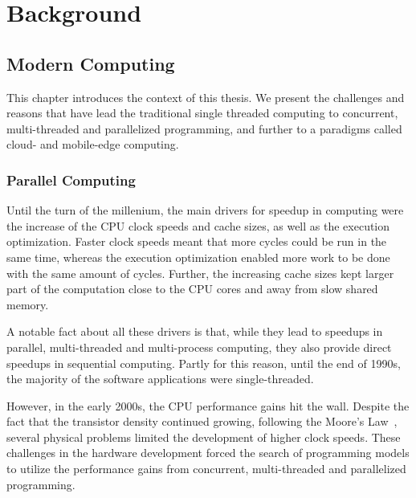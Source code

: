 \chapter{Background}
\label{chapter:background}


\section{Modern Computing}
This chapter introduces the context of this thesis. We present the challenges and reasons that have lead the traditional single threaded computing to concurrent, multi-threaded and parallelized programming, and further to a paradigms called cloud- and mobile-edge computing.

\subsection{Parallel Computing}
\label{section:parallel-computing}
Until the turn of the millenium, the main drivers for speedup in computing were the increase of the CPU clock speeds and cache sizes, as well as the execution optimization. Faster clock speeds meant that more cycles could be run in the same time, whereas the execution optimization enabled more work to be done with the same amount of cycles. Further, the increasing cache sizes kept larger part of the computation close to the CPU cores and away from slow shared memory.~\cite{Sutter:2005:FLiO}

A notable fact about all these drivers is that, while they lead to speedups in parallel, multi-threaded and multi-process computing, they also provide direct speedups in sequential computing. Partly for this reason, until the end of 1990s, the majority of the software applications were single-threaded.~\cite{Sutter:2005:FLiO}

However, in the early 2000s, the CPU performance gains hit the wall. Despite the fact that the transistor density continued growing, following the Moore's Law~\cite{Moore:1998:MooresLaw}, several physical problems limited the development of higher clock speeds. These challenges in the hardware development forced the search of programming models to utilize the performance gains from concurrent, multi-threaded and parallelized programming.~\cite{Sutter:2005:FLiO}


